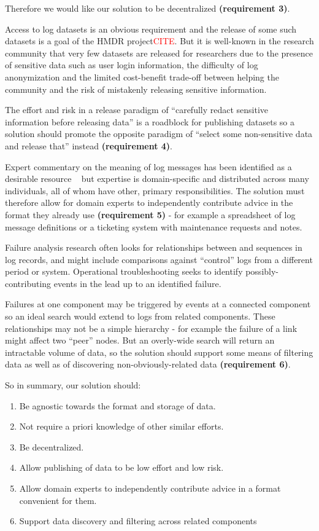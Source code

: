 Therefore we would like our solution to be decentralized 
\textbf{(requirement 3)}.

Access to log datasets is an obvious requirement and the release 
of some such datasets is a goal of the HMDR project\textcolor{red}{CITE}. 
But it is well-known in the research 
community that very few datasets are released for researchers
due to the presence of sensitive data such as user login information, 
the difficulty of log anonymization and the limited cost-benefit 
trade-off between helping the community and the risk of mistakenly 
releasing sensitive information. 

The effort and risk in a release paradigm of ``carefully redact 
sensitive information before releasing data'' is a roadblock for 
publishing datasets so a solution should promote the opposite 
paradigm of ``select some non-sensitive data and release that'' 
instead \textbf{(requirement 4)}.

Expert commentary on the meaning of log messages has been identified as
a desirable resource ~\cite{CUG2016BoF} but expertise is domain-specific
and distributed across many individuals, all of whom have other, primary 
responsibilities. The solution must therefore allow for
domain experts to independently contribute advice in the format they
already use \textbf{(requirement 5)} - for example a
spreadsheet of log message definitions or a ticketing system with
maintenance requests and notes.

Failure analysis research often looks for relationships between 
and sequences in log records, and might include comparisons against 
``control'' logs from a different period or system. Operational 
troubleshooting seeks to identify possibly-contributing events in the lead 
up to an identified failure. 

Failures at one component may be triggered by events 
at a connected component so an ideal search would extend to logs from
related components. These relationships may not be a simple hierarchy
 - for example the failure of a link might affect two ``peer'' nodes.
But an overly-wide search will return an intractable volume of data, so
the solution should support some means of filtering data as well as 
of discovering non-obviously-related data \textbf{(requirement 6)}.

So in summary, our solution should:
\begin{enumerate}
\item Be agnostic towards the format and storage of data.
\item Not require a priori knowledge of other similar efforts.
\item Be decentralized.
\item Allow publishing of data to be low effort and low risk.
\item Allow domain experts to independently contribute advice 
      in a format convenient for them.
\item Support data discovery and filtering across related components
\end{enumerate}

